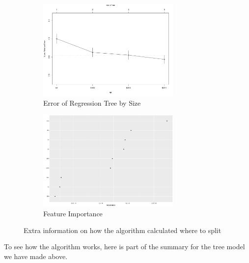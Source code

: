 \documentclass[11pt,a4paper]{report}
\begin{document}
\begin{figure}
\centering
\begin{subfigure}{.5\textwidth}
    \centering
    \includegraphics[width = 7cm]{photographs/regerror.pdf}
    \caption{Error of Regression Tree by Size}
    \label{fig:regerror}
\end{subfigure}%
\begin{subfigure}{.5\textwidth}
    \centering
    \includegraphics[width = 7cm]{photographs/regimportance.pdf}
    \caption{Feature Importance}
    \label{fig:regimp}
\end{subfigure}
\caption{Extra information on how the algorithm calculated where to split}
\label{fig:regsidedata}
\end{figure}

To see how the algorithm works, here is part of the summary for the tree model we have made above.
\end{document}
